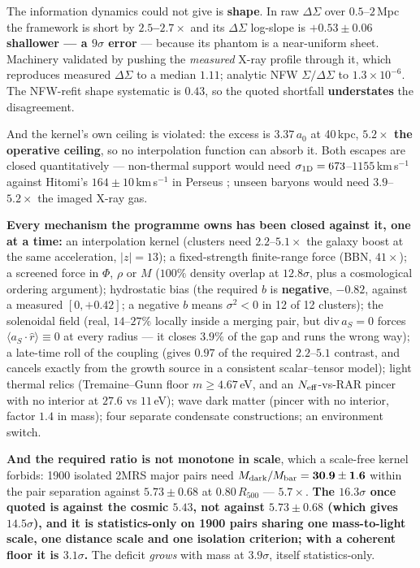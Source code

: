 \documentclass[11pt,letterpaper]{article}
\begin{document}
The information dynamics could not give is \textbf{shape}. In raw $\Delta\Sigma$ over $0.5$--$2$\,Mpc the framework is short by \textbf{$2.5$--$2.7\times$} and its $\Delta\Sigma$ log-slope is \textbf{$+0.53\pm0.06$ shallower --- a $9\sigma$ error} --- because its phantom is a near-uniform sheet. Machinery validated by pushing the \emph{measured} X-ray profile through it, which reproduces measured $\Delta\Sigma$ to a median $1.11$; analytic NFW $\Sigma/\Delta\Sigma$ to $1.3\times10^{-6}$. The NFW-refit shape systematic is $0.43$, so the quoted shortfall \textbf{understates} the disagreement.

And the kernel's own ceiling is violated: the excess is $3.37\,a_0$ at 40\,kpc, \textbf{$5.2\times$ the operative ceiling}, so no interpolation function can absorb it. Both escapes are closed quantitatively --- non-thermal support would need $\sigma_{\rm 1D}=673$--$1155$\,km\,s$^{-1}$ against Hitomi's $164\pm10$\,km\,s$^{-1}$ in Perseus \cite{hitomi}; unseen baryons would need $3.9$--$5.2\times$ the imaged X-ray gas.

\textbf{Every mechanism the programme owns has been closed against it, one at a time:} an interpolation kernel (clusters need $2.2$--$5.1\times$ the galaxy boost at the same acceleration, $|z|=13$); a fixed-strength finite-range force (BBN, $41\times$); a screened force in $\Phi$, $\rho$ or $M$ ($100\%$ density overlap at $12.8\sigma$, plus a cosmological ordering argument); hydrostatic bias (the required $b$ is \textbf{negative}, $-0.82$, against a measured $[0,+0.42]$; a negative $b$ means $\sigma^2<0$ in 12 of 12 clusters); the solenoidal field (real, $14$--$27\%$ locally inside a merging pair, but $\mathrm{div}\,a_S=0$ forces $\langle a_S\!\cdot\!\hat r\rangle\equiv0$ at every radius --- it closes $3.9\%$ of the gap and runs the wrong way); a late-time roll of the coupling (gives $0.97$ of the required $2.2$--$5.1$ contrast, and cancels exactly from the growth source in a consistent scalar--tensor model); light thermal relics (Tremaine--Gunn floor \cite{tg79} $m\ge4.67$\,eV, and an $N_{\rm eff}$-vs-RAR pincer with no interior at $27.6$ vs $11$\,eV); wave dark matter (pincer with no interior, factor $1.4$ in mass); four separate condensate constructions; an environment switch.

\textbf{And the required ratio is not monotone in scale}, which a scale-free kernel forbids: 1900 isolated 2MRS \cite{twomrs} major pairs need $M_{\rm dark}/M_{\rm bar}=\mathbf{30.9\pm1.6}$ within the pair separation against $5.73\pm0.68$ at $0.80\,R_{500}$ --- $5.7\times$. \textbf{The $16.3\sigma$ once quoted is against the cosmic $5.43$, not against $5.73\pm0.68$ (which gives $14.5\sigma$), and it is statistics-only on 1900 pairs sharing one mass-to-light scale, one distance scale and one isolation criterion; with a coherent floor it is $3.1\sigma$.} The deficit \emph{grows} with mass at $3.9\sigma$, itself statistics-only.
\end{document}
